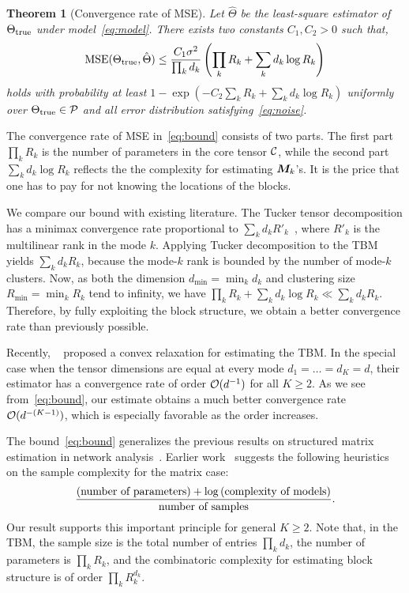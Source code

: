 \documentclass{article}
\newtheorem{theorem}{Theorem}
\begin{document}
\begin{theorem}[Convergence rate of MSE] \label{thm:mse}
Let $\hat \Theta$ be the least-square estimator of $\Theta_{\text{true}}$ under model~\eqref{eq:model}. There exists two constants $C_1, C_2>0$ such that,  
\begin{equation} \label{eq:bound}
\text{MSE}(\Theta_{\text{true}},\hat \Theta)\leq {C_1 \sigma^2\over  \prod_k d_k} \left(\prod_k R_k+\sum_k d_k \log R_k\right)
\end{equation}
holds with probability at least $1-\exp(-C_2\sum_k R_k+\sum_k d_k\log R_k)$ uniformly over $\Theta_{\text{true}}\in\mathcal{P}$ and all error distribution satisfying~\eqref{eq:noise}. 
\end{theorem}

The convergence rate of MSE in~\eqref{eq:bound} consists of two parts. The first part $\prod_k R_k$ is the number of parameters in the core tensor $\mathcal{C}$, while the second part $\sum_k d_k \log R_k$ reflects the the complexity for estimating $\boldsymbol{M}_k$'s. It is the price that one has to pay for not knowing the locations of the blocks.  

We compare our bound with existing literature. The Tucker tensor decomposition has a minimax convergence rate proportional to $\sum_kd_kR'_k$~\cite{zhang2018tensor}, where $R'_k$ is the multilinear rank in the mode $k$. Applying Tucker decomposition to the TBM yields $\sum_kd_kR_k$, because the mode-$k$ rank is bounded by the number of mode-$k$ clusters. Now, as both the dimension $d_{\min}=\min_kd_k$ and clustering size $R_{\min}=\min_k R_k$ tend to infinity, we have $\prod_k R_k+ \sum_k d_k \log R_k\ll \sum_k d_k R_k$. Therefore, by fully exploiting the block structure, we obtain a better convergence rate than previously possible. 

Recently, ~\cite{chi2018provable} proposed a convex relaxation for estimating the TBM. In the special case when the tensor dimensions are equal at every mode $d_1=\ldots=d_K=d$, their estimator has a convergence rate of order $\mathcal{O}(d^{-1})$ for all $K\geq 2$. As we see from~\eqref{eq:bound}, our estimate obtains a much better convergence rate $\mathcal{O}(d^{-(K-1)})$, which is especially favorable as the order increases. 


The bound~\eqref{eq:bound} generalizes the previous results on structured matrix estimation in network analysis~\cite{gao2016optimal,gao2018minimax}. %
Earlier work~\cite{gao2018minimax} suggests the following heuristics on the sample complexity for the matrix case:
\begin{equation} \label{eq:intuition}
{\text{(number of parameters)}+ \log \text{(complexity of models)}\over \text{number of samples}}.
\end{equation}
Our result supports this important principle for general $K\geq 2$. Note that, in the TBM, the sample size is the total number of entries $\prod_k d_k$, the number of parameters is $\prod_k R_k$, and the combinatoric complexity for estimating block structure is of order $\prod_k R_k^{d_k}$. 
\end{document}
